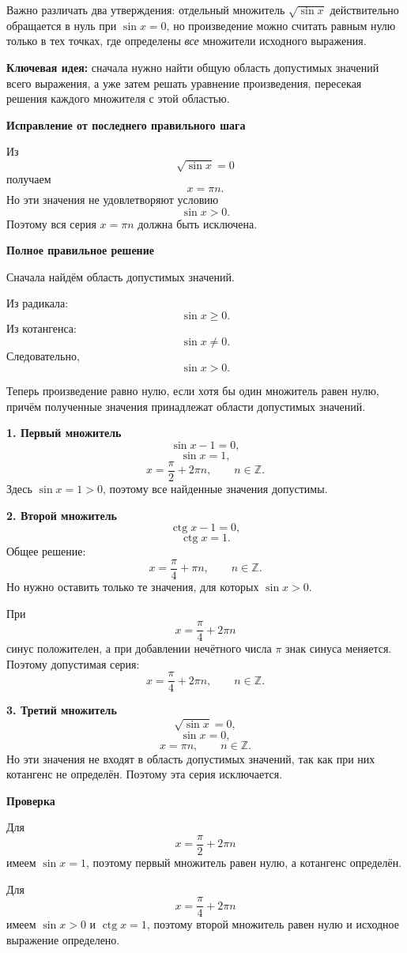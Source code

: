 \documentclass[12pt,a4paper]{article}
\newcommand{\idea}{\textcolor{blue!60!black}{Ключевая идея:}}
\begin{document}
Важно различать два утверждения: отдельный множитель \(\sqrt{\sin x}\) действительно обращается в нуль при \(\sin x=0\), но произведение можно считать равным нулю только в тех точках, где определены \emph{все} множители исходного выражения.

\textbf{\idea} сначала нужно найти общую область допустимых значений всего выражения, а уже затем решать уравнение произведения, пересекая решения каждого множителя с этой областью.

\textbf{Исправление от последнего правильного шага}

Из
\[
\sqrt{\sin x}=0
\]
получаем
\[
x=\pi n.
\]
Но эти значения не удовлетворяют условию
\[
\sin x>0.
\]
Поэтому вся серия \(x=\pi n\) должна быть исключена.

\textbf{Полное правильное решение}

Сначала найдём область допустимых значений.

Из радикала:
\[
\sin x\ge 0.
\]
Из котангенса:
\[
\sin x\ne 0.
\]
Следовательно,
\[
\sin x>0.
\]

Теперь произведение равно нулю, если хотя бы один множитель равен нулю, причём полученные значения принадлежат области допустимых значений.

\textbf{1. Первый множитель}
\[
\sin x-1=0,
\]
\[
\sin x=1,
\]
\[
x=\frac{\pi}{2}+2\pi n,\qquad n\in\mathbb Z.
\]
Здесь \(\sin x=1>0\), поэтому все найденные значения допустимы.

\textbf{2. Второй множитель}
\[
\operatorname{ctg}x-1=0,
\]
\[
\operatorname{ctg}x=1.
\]
Общее решение:
\[
x=\frac{\pi}{4}+\pi n,\qquad n\in\mathbb Z.
\]
Но нужно оставить только те значения, для которых \(\sin x>0\).

При
\[
x=\frac{\pi}{4}+2\pi n
\]
синус положителен, а при добавлении нечётного числа \(\pi\) знак синуса меняется. Поэтому допустимая серия:
\[
x=\frac{\pi}{4}+2\pi n,\qquad n\in\mathbb Z.
\]

\textbf{3. Третий множитель}
\[
\sqrt{\sin x}=0,
\]
\[
\sin x=0,
\]
\[
x=\pi n,\qquad n\in\mathbb Z.
\]
Но эти значения не входят в область допустимых значений, так как при них котангенс не определён. Поэтому эта серия исключается.

\textbf{Проверка}

Для
\[
x=\frac{\pi}{2}+2\pi n
\]
имеем \(\sin x=1\), поэтому первый множитель равен нулю, а котангенс определён.

Для
\[
x=\frac{\pi}{4}+2\pi n
\]
имеем \(\sin x>0\) и \(\operatorname{ctg}x=1\), поэтому второй множитель равен нулю и исходное выражение определено.
\end{document}
